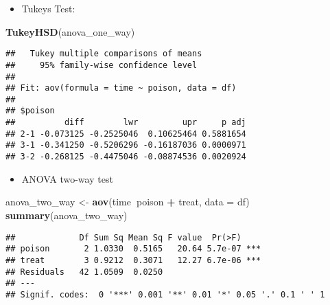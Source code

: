 \documentclass[
]{article}
\newenvironment{Shaded}{\begin{snugshade}}{\end{snugshade}}
\newcommand{\DataTypeTok}[1]{\textcolor[rgb]{0.13,0.29,0.53}{#1}}
\newcommand{\KeywordTok}[1]{\textcolor[rgb]{0.13,0.29,0.53}{\textbf{#1}}}
\newcommand{\NormalTok}[1]{#1}
\newcommand{\OperatorTok}[1]{\textcolor[rgb]{0.81,0.36,0.00}{\textbf{#1}}}
\newcommand{\StringTok}[1]{\textcolor[rgb]{0.31,0.60,0.02}{#1}}
\providecommand{\tightlist}{%
  \setlength{\itemsep}{0pt}\setlength{\parskip}{0pt}}
\begin{document}
\begin{itemize}
\tightlist
\item
  Tukeys Test:
\end{itemize}

\begin{Shaded}
\begin{Highlighting}[]
\KeywordTok{TukeyHSD}\NormalTok{(anova_one_way)}
\end{Highlighting}
\end{Shaded}

\begin{verbatim}
##   Tukey multiple comparisons of means
##     95% family-wise confidence level
## 
## Fit: aov(formula = time ~ poison, data = df)
## 
## $poison
##          diff        lwr         upr     p adj
## 2-1 -0.073125 -0.2525046  0.10625464 0.5881654
## 3-1 -0.341250 -0.5206296 -0.16187036 0.0000971
## 3-2 -0.268125 -0.4475046 -0.08874536 0.0020924
\end{verbatim}

\begin{itemize}
\tightlist
\item
  ANOVA two-way test
\end{itemize}

\begin{Shaded}
\begin{Highlighting}[]
\NormalTok{anova_two_way <-}\StringTok{ }\KeywordTok{aov}\NormalTok{(time}\OperatorTok{~}\NormalTok{poison }\OperatorTok{+}\StringTok{ }\NormalTok{treat, }\DataTypeTok{data =}\NormalTok{ df)}
\KeywordTok{summary}\NormalTok{(anova_two_way)}
\end{Highlighting}
\end{Shaded}

\begin{verbatim}
##             Df Sum Sq Mean Sq F value  Pr(>F)    
## poison       2 1.0330  0.5165   20.64 5.7e-07 ***
## treat        3 0.9212  0.3071   12.27 6.7e-06 ***
## Residuals   42 1.0509  0.0250                    
## ---
## Signif. codes:  0 '***' 0.001 '**' 0.01 '*' 0.05 '.' 0.1 ' ' 1
\end{verbatim}
\end{document}
